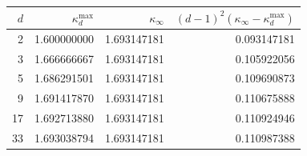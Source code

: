 \begin{tabular}{r r r r}
\toprule
$d$ & $\kappa_d^{\max}$ & $\kappa_\infty$ & $(d-1)^2(\kappa_\infty-\kappa_d^{\max})$\\
\midrule
2 & 1.600000000 & 1.693147181 & 0.093147181\\
3 & 1.666666667 & 1.693147181 & 0.105922056\\
5 & 1.686291501 & 1.693147181 & 0.109690873\\
9 & 1.691417870 & 1.693147181 & 0.110675888\\
17 & 1.692713880 & 1.693147181 & 0.110924946\\
33 & 1.693038794 & 1.693147181 & 0.110987388\\
\bottomrule
\end{tabular}
